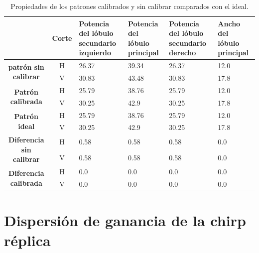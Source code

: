\begin{table}[H]
  \footnotesize
  \centering
  \begin{tabular}{|c|c|p{2cm}|p{2cm}|p{2cm}|p{2cm}|}
    \cline{2-6}
    \multicolumn{1}{c|}{} & \textbf{Corte} & \textbf{Potencia del lóbulo secundario izquierdo} & \textbf{Potencia del lóbulo principal} &
    \textbf{Potencia del lóbulo secundario derecho} & \textbf{Ancho del lóbulo principal} \tabularnewline\hline
    \multirow{2}{*}{\textbf{patrón sin calibrar}} & H & 26.37 & 39.34 & 26.37 & 12.0 \tabularnewline\cline{2-6}
     & V & 30.83 & 43.48 & 30.83 & 17.8 \tabularnewline\hline
    \multirow{2}{*}{\textbf{Patrón calibrada}} & H & 25.79 & 38.76 & 25.79 & 12.0 \tabularnewline\cline{2-6}
     & V & 30.25 & 42.9 & 30.25 & 17.8 \tabularnewline\hline
    \multirow{2}{*}{\textbf{Patrón ideal}} & H & 25.79 & 38.76 & 25.79 & 12.0 \tabularnewline\cline{2-6}
     & V & 30.25 & 42.9 & 30.25 & 17.8 \tabularnewline\hline
    \multirow{2}{*}{\textbf{Diferencia sin calibrar}} & H & 0.58 & 0.58 & 0.58 & 0.0\tabularnewline\cline{2-6}
     & V & 0.58 & 0.58 & 0.58 & 0.0 \tabularnewline\hline
    \multirow{2}{*}{\textbf{Diferencia calibrada}} & H & 0.0 & 0.0 & 0.0 & 0.0 \tabularnewline\cline{2-6}
     & V & 0.0 & 0.0 & 0.0 & 0.0 \tabularnewline\hline
  \end{tabular}
  \caption{Propiedades de los patrones calibrados y sin calibrar comparados con el ideal.}
  \label{tab:chirpErrMutual10degRow}
\end{table}


\section{Dispersión de ganancia de la chirp réplica}

